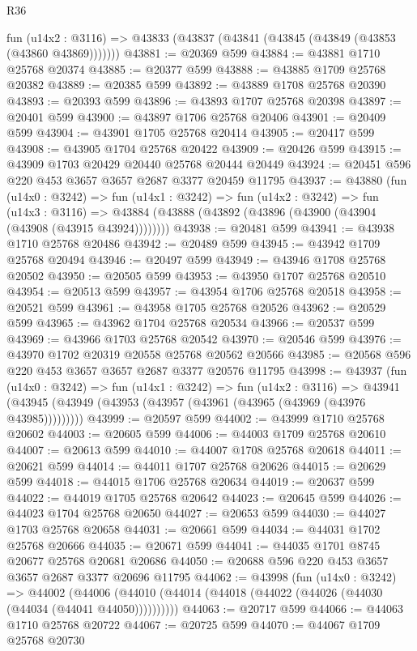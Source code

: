 \begin{lexlean}{R36}
\begin{coremodule}
    fun (u14x2 : @3116) => @43833 (@43837 (@43841 (@43845 (@43849 (@43853 (@43860 @43869)))))))
@43881 := @20369 @599
@43884 := @43881 @1710 @25768 @20374
@43885 := @20377 @599
@43888 := @43885 @1709 @25768 @20382
@43889 := @20385 @599
@43892 := @43889 @1708 @25768 @20390
@43893 := @20393 @599
@43896 := @43893 @1707 @25768 @20398
@43897 := @20401 @599
@43900 := @43897 @1706 @25768 @20406
@43901 := @20409 @599
@43904 := @43901 @1705 @25768 @20414
@43905 := @20417 @599
@43908 := @43905 @1704 @25768 @20422
@43909 := @20426 @599
@43915 := @43909 @1703 @20429 @20440 @25768 @20444 @20449
@43924 := @20451 @596 @220 @453 @3657 @3657 @2687 @3377 @20459 @11795
@43937 := @43880
    (fun (u14x0 : @3242) =>
    fun (u14x1 : @3242) =>
    fun (u14x2 : @3242) =>
    fun (u14x3 : @3116) =>
    @43884 (@43888 (@43892 (@43896 (@43900 (@43904 (@43908 (@43915 @43924))))))))
@43938 := @20481 @599
@43941 := @43938 @1710 @25768 @20486
@43942 := @20489 @599
@43945 := @43942 @1709 @25768 @20494
@43946 := @20497 @599
@43949 := @43946 @1708 @25768 @20502
@43950 := @20505 @599
@43953 := @43950 @1707 @25768 @20510
@43954 := @20513 @599
@43957 := @43954 @1706 @25768 @20518
@43958 := @20521 @599
@43961 := @43958 @1705 @25768 @20526
@43962 := @20529 @599
@43965 := @43962 @1704 @25768 @20534
@43966 := @20537 @599
@43969 := @43966 @1703 @25768 @20542
@43970 := @20546 @599
@43976 := @43970 @1702 @20319 @20558 @25768 @20562 @20566
@43985 := @20568 @596 @220 @453 @3657 @3657 @2687 @3377 @20576 @11795
@43998 := @43937
    (fun (u14x0 : @3242) =>
    fun (u14x1 : @3242) =>
    fun (u14x2 : @3116) =>
    @43941 (@43945 (@43949 (@43953 (@43957 (@43961 (@43965 (@43969 (@43976 @43985)))))))))
@43999 := @20597 @599
@44002 := @43999 @1710 @25768 @20602
@44003 := @20605 @599
@44006 := @44003 @1709 @25768 @20610
@44007 := @20613 @599
@44010 := @44007 @1708 @25768 @20618
@44011 := @20621 @599
@44014 := @44011 @1707 @25768 @20626
@44015 := @20629 @599
@44018 := @44015 @1706 @25768 @20634
@44019 := @20637 @599
@44022 := @44019 @1705 @25768 @20642
@44023 := @20645 @599
@44026 := @44023 @1704 @25768 @20650
@44027 := @20653 @599
@44030 := @44027 @1703 @25768 @20658
@44031 := @20661 @599
@44034 := @44031 @1702 @25768 @20666
@44035 := @20671 @599
@44041 := @44035 @1701 @8745 @20677 @25768 @20681 @20686
@44050 := @20688 @596 @220 @453 @3657 @3657 @2687 @3377 @20696 @11795
@44062 := @43998
    (fun (u14x0 : @3242) =>
    @44002 (@44006 (@44010 (@44014 (@44018 (@44022 (@44026 (@44030 (@44034 (@44041 @44050))))))))))
@44063 := @20717 @599
@44066 := @44063 @1710 @25768 @20722
@44067 := @20725 @599
@44070 := @44067 @1709 @25768 @20730

\end{coremodule}
\end{lexlean}
